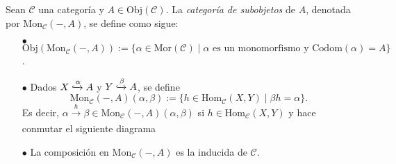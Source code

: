 \documentclass[tesis]{subfiles}
\begin{document}
\begin{Def}\label{Def: Categoría de subobjetos}
    Sean $\mathscr{C}$ una categoría y $A\in\text{Obj}(\mathscr{C})$. La \emph{categoría de subobjetos} de $A$, denotada por $\text{Mon}_\mathscr{C}(-,A)$, se define como sigue:

    \begin{itemize}
    
        \item[$\bullet$] $\text{Obj}(\text{Mon}_\mathscr{C}(-,A)) := \{\alpha\in\text{Mor}(\mathscr{C}) \mid \alpha \text{ es un monomorfismo y } \text{Codom}(\alpha)=A\}$.

        \item[$\bullet$] Dados $X\xhookrightarrow{\alpha}A$ y $Y\xhookrightarrow{\beta}A$, se define
            \[
                \text{Mon}_\mathscr{C}(-,A)(\alpha,\beta) := \{h\in \text{Hom}_\mathscr{C}(X,Y) \mid \beta h=\alpha\}.
            \] 
            Es decir, $\alpha\xrightarrow[]{h}\beta\in\text{Mon}_\mathscr{C}(-,A)(\alpha,\beta)$ si $h\in\text{Hom}_\mathscr{C}(X,Y)$ y hace conmutar el siguiente diagrama
            \begin{center}
            \end{center}

        \item[$\bullet$] La composición en $\text{Mon}_\mathscr{C}(-,A)$ es la inducida de $\mathscr{C}$.
    \end{itemize}
\end{Def}
\end{document}
